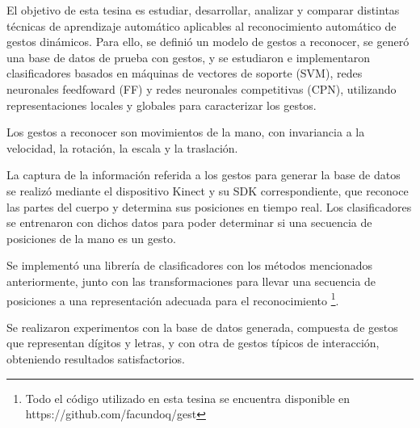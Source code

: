 El objetivo de esta tesina es estudiar, desarrollar, analizar y comparar distintas técnicas de aprendizaje automático aplicables al reconocimiento automático de gestos dinámicos. Para ello, se definió un modelo de gestos a reconocer, se generó una base de datos de prueba con gestos, y se estudiaron e implementaron clasificadores basados en máquinas de vectores de soporte (SVM), redes neuronales feedfoward (FF) y redes neuronales competitivas (CPN), utilizando  representaciones locales y globales para caracterizar los gestos. 

Los gestos a reconocer son movimientos de la mano, con invariancia a la velocidad, la rotación, la escala y la traslación. 

La captura de la información referida a los gestos para generar la base de datos se realizó mediante el dispositivo Kinect y su SDK correspondiente, que reconoce las partes del cuerpo y determina sus posiciones en tiempo real. Los clasificadores se entrenaron con dichos datos para poder determinar si una secuencia de posiciones de la mano es un gesto. 

Se implementó una librería de clasificadores con los métodos mencionados anteriormente, junto con las transformaciones para llevar una secuencia de posiciones a una representación adecuada para el reconocimiento \footnote{Todo el código utilizado en esta tesina se encuentra disponible en https://github.com/facundoq/gest}.

Se realizaron experimentos con la base de datos  generada, compuesta de gestos que representan dígitos y letras, y con otra de gestos típicos de interacción, obteniendo resultados satisfactorios.

